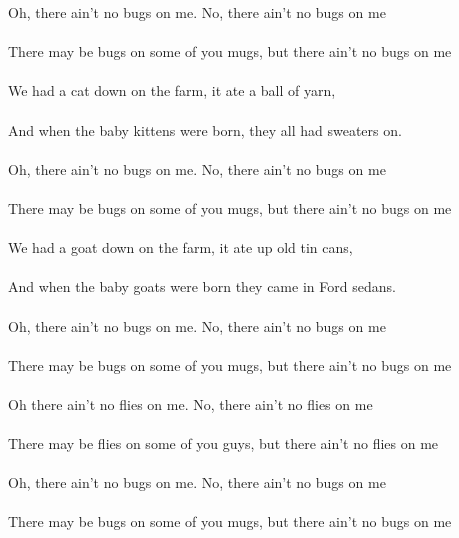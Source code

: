 Oh, there ain't no bugs on me. No, there ain't no bugs on me\\
\\
There may be bugs on some of you mugs, but there ain't no bugs on me \\
\\
We had a cat down on the farm, it ate a ball of yarn,\\
\\
And when the baby kittens were born, they all had sweaters on. \\
\\
Oh, there ain't no bugs on me. No, there ain't no bugs on me\\
\\
There may be bugs on some of you mugs, but there ain't no bugs on me \\
\\
We had a goat down on the farm, it ate up old tin cans,\\
\\
And when the baby goats were born they came in Ford sedans. \\
\\
Oh, there ain't no bugs on me. No, there ain't no bugs on me\\
\\
There may be bugs on some of you mugs, but there ain't no bugs on me \\
\\
Oh there ain't no flies on me. No, there ain't no flies on me\\
\\
There may be flies on some of you guys, but there ain't no flies on me \\
\\
Oh, there ain't no bugs on me. No, there ain't no bugs on me\\
\\
There may be bugs on some of you mugs, but there ain't no bugs on me\\
